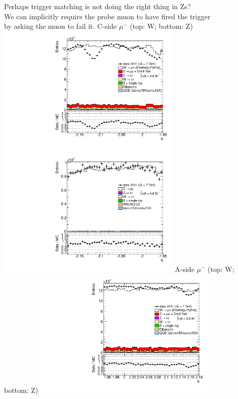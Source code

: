  {
   Perhaps trigger matching is not doing the right thing in Zs? \\
   We can implicitly require the probe muon to have fired the trigger \\
   by asking the  muon to fail it.
}
 {
\colb[T]
C-side $\mu^{-}$ (top: W; bottom: Z)
\centering
\includegraphics[width=0.66\textwidth]{dates/20130306/figures/etaphi/W_10_C_stack_l_eta_POS} \\
\includegraphics[width=0.66\textwidth]{dates/20130306/figures/etaphi/Z_10_C_stack_lP_eta_ALL.pdf}
A-side $\mu^{-}$ (top: W; bottom: Z)
\centering
\includegraphics[width=0.66\textwidth]{dates/20130306/figures/etaphi/W_10_A_stack_l_eta_POS} \\
}
